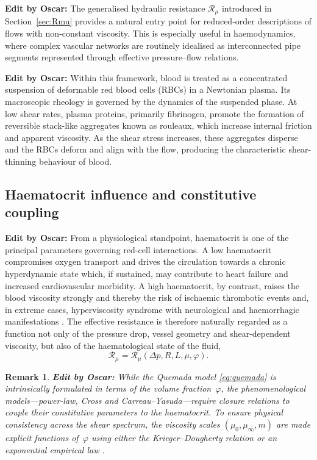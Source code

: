 \documentclass[lineno]{jfm}
\newtheorem{remark}{Remark}
\newcommand{\orn}[1]{{\color{red} \textbf{Edit by Oscar:} #1}}
\begin{document}
\orn{The generalised hydraulic resistance $\mathcal{R}_{\mu}$ introduced in Section~\ref{sec:Rmu} provides a natural entry point for reduced-order descriptions of flows with non-constant viscosity. This is especially useful in haemodynamics, where complex vascular networks are routinely idealised as interconnected pipe segments represented through effective pressure--flow relations.}

\orn{Within this framework, blood is treated as a concentrated suspension of deformable red blood cells (RBCs) in a Newtonian plasma. Its macroscopic rheology is governed by the dynamics of the suspended phase. At low shear rates, plasma proteins, primarily fibrinogen, promote the formation of reversible stack-like aggregates known as rouleaux, which increase internal friction and apparent viscosity. As the shear stress increases, these aggregates disperse and the RBCs deform and align with the flow, producing the characteristic shear-thinning behaviour of blood.}


\subsection{Haematocrit influence and constitutive coupling}
\label{sec:haematocrit}

\orn{From a physiological standpoint, haematocrit is one of the principal parameters
governing red-cell interactions. A low haematocrit compromises oxygen transport
and drives the circulation towards a chronic hyperdynamic state which, if
sustained, may contribute to heart failure and increased cardiovascular
morbidity. A high haematocrit, by contrast, raises the blood viscosity strongly
and thereby the risk of ischaemic thrombotic events and, in extreme cases,
hyperviscosity syndrome with neurological and haemorrhagic manifestations
\citep{Mozos2015,Nader2019,Isbister1994}. The effective resistance is therefore
naturally regarded as a function not only of the pressure drop, vessel geometry
and shear-dependent viscosity, but also of the haematological state of the fluid,}
\begin{equation}
\mathcal{R}_{\mu}=\mathcal{R}_{\mu}(\Delta p,R,L,\mu,\varphi).
\label{eq:Rmu_phi}
\end{equation}

\begin{remark}
\orn{While the Quemada model \eqref{eq:quemada} is intrinsically formulated in terms
of the volume fraction~$\varphi$, the phenomenological models---power-law, Cross
and Carreau--Yasuda---require closure relations to couple their constitutive
parameters to the haematocrit. To ensure physical consistency across the shear
spectrum, the viscosity scales $(\mu_0,\mu_\infty,m)$ are made explicit functions
of~$\varphi$ using either the Krieger--Dougherty relation \citep{Krieger1959} or
an exponential empirical law \citep{CokeletA1963,CokeletB1963}.}
\end{remark}
\end{document}
